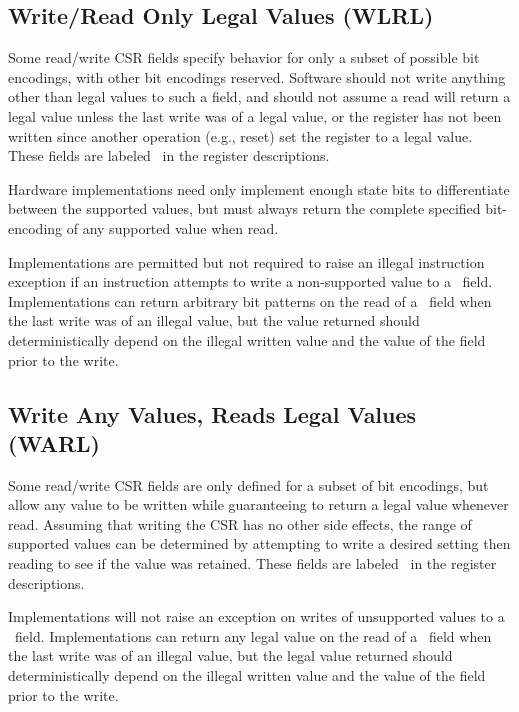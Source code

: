 \subsection*{Write/Read Only Legal Values (WLRL)}

Some read/write CSR fields specify behavior for only a subset of
possible bit encodings, with other bit encodings reserved.  Software
should not write anything other than legal values to such a field, and
should not assume a read will return a legal value unless the last
write was of a legal value, or the register has not been written since
another operation (e.g., reset) set the register to a legal value.
These fields are labeled \wlrl\ in the register descriptions.
 
\begin{commentary}
Hardware implementations need only implement enough state bits to
differentiate between the supported values, but must always return the
complete specified bit-encoding of any supported value when read.
\end{commentary}

Implementations are permitted but not required to raise an illegal
instruction exception if an instruction attempts to write a
non-supported value to a \wlrl\ field.  Implementations can
return arbitrary bit patterns on the read of a \wlrl\ field when the last
write was of an illegal value, but the value returned should
deterministically depend on the illegal written value and
the value of the field prior to the write.

\subsection*{Write Any Values, Reads Legal Values (WARL)}

Some read/write CSR fields are only defined for a subset of bit
encodings, but allow any value to be written while guaranteeing to
return a legal value whenever read.  Assuming that writing the CSR has
no other side effects, the range of supported values can be determined
by attempting to write a desired setting then reading to see if the
value was retained.  These fields are labeled \warl\ in the register
descriptions.

Implementations will not raise an exception on writes of unsupported
values to a \warl\ field.  Implementations can
return any legal value on the read of a \warl\ field when the last
write was of an illegal value, but the legal value returned should
deterministically depend on the illegal written value and
the value of the field prior to the write.

